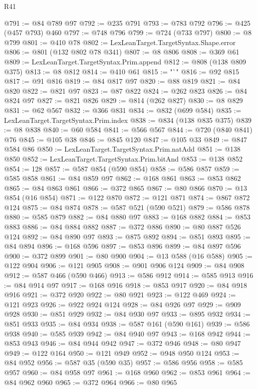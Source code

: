 \begin{lexlean}{R41}
\begin{coremodule}
@791 := @84 @789 @97
@792 := @235 @791
@793 := @783 @792
@796 := @425 (@457 @793) @460
@797 := @748 @796
@799 := @724 (@733 @797)
@800 := @8 @799
@801 := @410 @78
@802 := LexLeanTarget.TargetSyntax.Shape.error
@806 := @801 (@132 @802 @78 @341)
@807 := @8 @806
@808 := @369 @61
@809 := LexLeanTarget.TargetSyntax.Prim.append
@812 := @808 (@138 @809 @375)
@813 := @8 @812
@814 := @410 @61
@815 := "`"
@816 := @92 @815
@817 := @91 @816
@819 := @84 @817 @97
@820 := @88 @819
@821 := @84 @820
@822 := @821 @97
@823 := @87 @822
@824 := @262 @823
@826 := @84 @824 @97
@827 := @821 @826
@829 := @814 (@262 @827)
@830 := @8 @829
@831 := @62 @567
@832 := @366 @831
@834 := @832 (@699 @584)
@835 := LexLeanTarget.TargetSyntax.Prim.index
@838 := @834 (@138 @835 @375)
@839 := @8 @838
@840 := @60 @584
@841 := @566 @567
@844 := @720 (@840 @841) @76
@845 := @105 @38
@846 := @845 @120
@847 := @105 @33
@849 := @847 @584 @86
@850 := LexLeanTarget.TargetSyntax.Prim.natAdd
@851 := @138 @850
@852 := LexLeanTarget.TargetSyntax.Prim.bitAnd
@853 := @138 @852
@854 := 128
@857 := @587 @854 (@590 @854)
@858 := @586 @857
@859 := @585 @858
@861 := @84 @859 @97
@862 := @168 @861
@863 := @853 @862
@865 := @84 @863 @861
@866 := @372 @865
@867 := @80 @866
@870 := @13 @854 (@16 @854)
@871 := @122 @870
@872 := @121 @871
@874 := @867 @872 @124
@875 := @84 @874
@878 := @587 @521 (@590 @521)
@879 := @586 @878
@880 := @585 @879
@882 := @84 @880 @97
@883 := @168 @882
@884 := @853 @883
@886 := @84 @884 @882
@887 := @372 @886
@890 := @80 @887 @526 @124
@892 := @84 @890 @97
@893 := @875 @892
@894 := @851 @893
@895 := @84 @894
@896 := @168 @596
@897 := @853 @896
@899 := @84 @897 @596
@900 := @372 @899
@901 := @80 @900
@904 := @13 @588 (@16 @588)
@905 := @122 @904
@906 := @121 @905
@908 := @901 @906 @124
@909 := @84 @908
@912 := @587 @466 (@590 @466)
@913 := @586 @912
@914 := @585 @913
@916 := @84 @914 @97
@917 := @168 @916
@918 := @853 @917
@920 := @84 @918 @916
@921 := @372 @920
@922 := @80 @921
@923 := @122 @469
@924 := @121 @923
@926 := @922 @924 @124
@928 := @84 @926 @97
@929 := @909 @928
@930 := @851 @929
@932 := @84 @930 @97
@933 := @895 @932
@934 := @851 @933
@935 := @84 @934
@938 := @587 @161 (@590 @161)
@939 := @586 @938
@940 := @585 @939
@942 := @84 @940 @97
@943 := @168 @942
@944 := @853 @943
@946 := @84 @944 @942
@947 := @372 @946
@948 := @80 @947
@949 := @122 @164
@950 := @121 @949
@952 := @948 @950 @124
@953 := @84 @952
@956 := @587 @35 (@590 @35)
@957 := @586 @956
@958 := @585 @957
@960 := @84 @958 @97
@961 := @168 @960
@962 := @853 @961
@964 := @84 @962 @960
@965 := @372 @964
@966 := @80 @965

\end{coremodule}
\end{lexlean}
